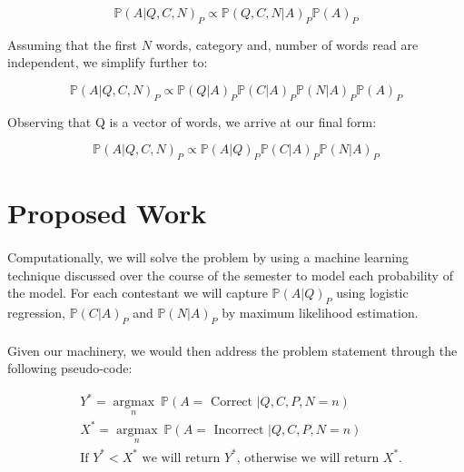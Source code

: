 \documentclass[letterpaper]{article}
\DeclareMathOperator{\argmax}{argmax}
\newcommand{\Prob}[1]{\mathbb{P}\left( #1 \right)}
\begin{document}
\begin{equation*}
\Prob{A \lvert Q, C, N}_P \propto \Prob{Q, C, N \lvert A}_P \Prob{A}_P
\end{equation*}

Assuming that the first $N$ words, category and, number of words read are independent, we simplify further to:

\begin{equation*}
\Prob{A \lvert Q, C, N}_P \propto \Prob{Q\lvert A}_P \Prob{C \lvert A}_P \Prob{N \lvert A}_P \Prob{A}_P
\end{equation*}

Observing that Q is a vector of words, we arrive at our final form:


\begin{equation*}
\Prob{A \lvert Q, C, N}_P \propto \Prob{A \lvert Q}_P \Prob{C \lvert A}_P \Prob{N \lvert A}_P
\end{equation*}

\section*{Proposed Work}

\paragraph{} Computationally, we will solve the problem by using a machine learning technique discussed over the course of the semester to model each probability of the model.  For each contestant we will capture $\Prob{A \lvert Q}_P$ using logistic regression, $\Prob{C \lvert A}_P$ and $\Prob{N \lvert A}_P$ by maximum likelihood estimation.

\paragraph{} Given our machinery, we would then address the problem statement through the following pseudo-code:

\begin{equation*}
\begin{split}
& Y^* = \underset{n}{\argmax} \ \Prob{A = \text{ Correct } \lvert Q, C, P, N = n} \\
& X^* = \underset{n}{\argmax} \ \Prob{A = \text{ Incorrect } \lvert Q, C, P, N = n} \\
& \text{If } Y^* < X^* \text{ we will return } Y^* \text{, otherwise we will return } X^*.
\end{split}
\end{equation*}
\end{document}
